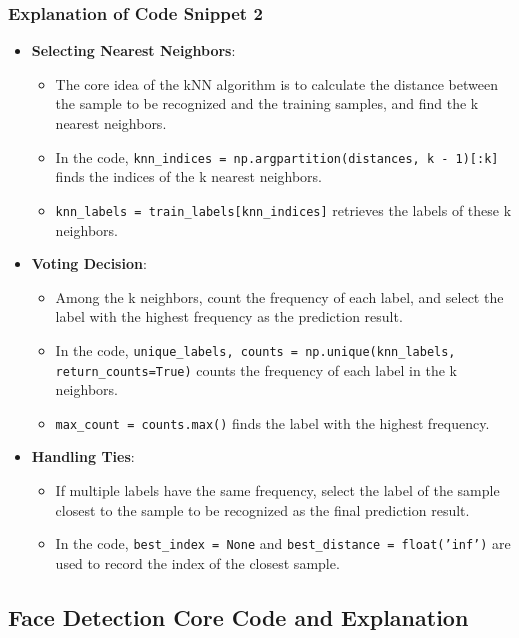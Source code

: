 \documentclass{article}
\begin{document}
\subsubsection{Explanation of Code Snippet 2}
\begin{itemize}
    \item \textbf{Selecting Nearest Neighbors}:
    \begin{itemize}
        \item The core idea of the kNN algorithm is to calculate the distance between the sample to be recognized and the training samples, and find the k nearest neighbors.
        \item In the code, \texttt{knn\_indices = np.argpartition(distances, k - 1)[:k]} finds the indices of the k nearest neighbors.
        \item \texttt{knn\_labels = train\_labels[knn\_indices]} retrieves the labels of these k neighbors.
    \end{itemize}
    \item \textbf{Voting Decision}:
    \begin{itemize}
        \item Among the k neighbors, count the frequency of each label, and select the label with the highest frequency as the prediction result.
        \item In the code, \texttt{unique\_labels, counts = np.unique(knn\_labels, return\_counts=True)} counts the frequency of each label in the k neighbors.
        \item \texttt{max\_count = counts.max()} finds the label with the highest frequency.
    \end{itemize}
    \item \textbf{Handling Ties}:
    \begin{itemize}
        \item If multiple labels have the same frequency, select the label of the sample closest to the sample to be recognized as the final prediction result.
        \item In the code, \texttt{best\_index = None} and \texttt{best\_distance = float('inf')} are used to record the index of the closest sample.
    \end{itemize}
\end{itemize}

\subsection{Face Detection Core Code and Explanation}
\end{document}
